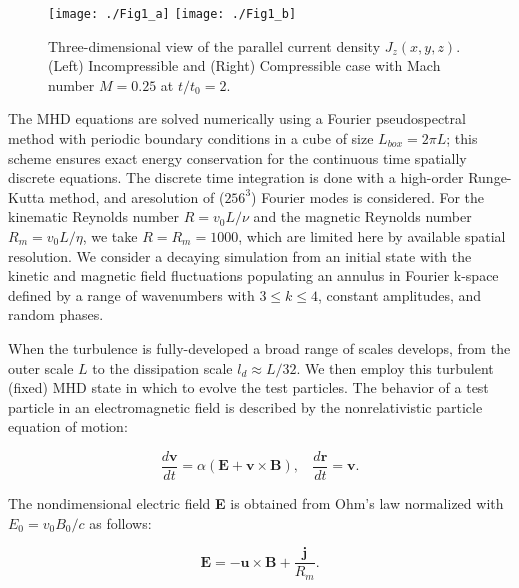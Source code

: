 \documentclass[%
aip,pop,amsmath,amssymb,
 reprint,%
]{revtex4-1}
\begin{document}
\begin{figure*}[<t>]
\begin{center}
{\texttt{[image: ./Fig1\_a]}}
{\texttt{[image: ./Fig1\_b]}}
\caption{Three-dimensional view of the parallel current density $J_z(x,y,z)$. (Left) 
Incompressible and (Right) Compressible case with Mach number $M=0.25$ at $t/t_0 =2$.}
\end{center}
\end{figure*}

The MHD equations are solved numerically using 
a Fourier pseudospectral method with periodic 
boundary conditions in a cube of size  $L_{box}=2\pi L$; 
this scheme ensures exact energy conservation for the continuous time spatially discrete
equations\cite{ghost}. The discrete time integration is done with a high-order Runge-Kutta
method, and aresolution of ($256^3$) Fourier modes is considered. For the kinematic Reynolds
number $R=v_0L/\nu$ and the magnetic Reynolds number $R_m=v_0L/\eta$, 
we take $R=R_m= 1000$, which are limited here by available
spatial resolution. We consider a decaying simulation from an 
initial state with the kinetic 
and magnetic field fluctuations populating an annulus in Fourier k-space 
defined by a range of wavenumbers with
$ 3\leq k \leq4$, constant amplitudes, and random phases.

When the turbulence is fully-developed a broad range of 
scales develops, from the outer scale $L$ to 
the dissipation scale $l_d\approx L/32$. We then employ this
turbulent (fixed) MHD state in which to evolve the test
particles. The behavior of a test particle in an electromagnetic field 
is described by the nonrelativistic particle equation of motion:

\begin{equation}
  \frac{d\textbf{v}}{dt} = \alpha(\textbf{E} + \textbf{v} \times \textbf{B}), \ \ \ \  \frac{d\textbf{r}}{dt} = \textbf{v}.
\end{equation}
 
The nondimensional electric field \textbf{E} is obtained from Ohm's law 
normalized with $E_0= v_0 B_0/c$ as follows:

\begin{equation} 
 \textbf{E} =  -\textbf{u}  \times \textbf{B} + \frac{\textbf{j}}{R_m}. 
\end{equation}
\end{document}
